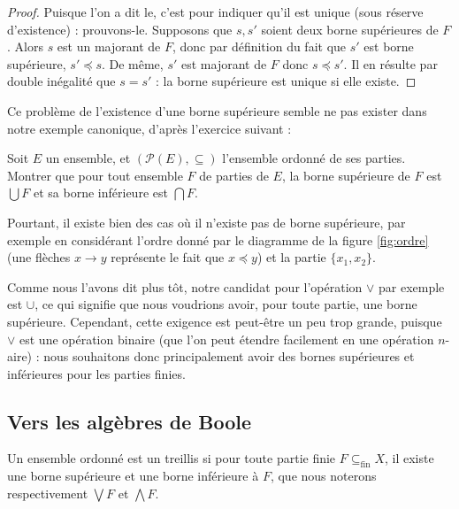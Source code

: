 \begin{proof}
    Puisque l'on a dit \og le\fg{}, c'est pour indiquer qu'il est unique (sous réserve d'existence) : prouvons-le. Supposons que $s,s'$ soient deux borne supérieures de $F$. Alors $s$ est un majorant de $F$, donc par définition du fait que $s'$ est borne supérieure, $s'\preceq s$. De même, $s'$ est majorant de $F$ donc $s\preceq s'$. Il en résulte par double inégalité que $s=s'$ : la borne supérieure est unique si elle existe.
\end{proof}

Ce problème de l'existence d'une borne supérieure semble ne pas exister dans notre exemple canonique, d'après l'exercice suivant :

\begin{exo}
    Soit $E$ un ensemble, et $(\mathcal P(E),\subseteq)$ l'ensemble ordonné de ses parties. Montrer que pour tout ensemble $F$ de parties de $E$, la borne supérieure de $F$ est $\bigcup F$ et sa borne inférieure est $\bigcap F$.
\end{exo}

Pourtant, il existe bien des cas où il n'existe pas de borne supérieure, par exemple en considérant l'ordre donné par le diagramme de la figure \ref{fig:ordre} (une flèches $x\to y$ représente le fait que $x\preceq y$) et la partie $\{x_1,x_2\}$.

\label{fig:ordre}

Comme nous l'avons dit plus tôt, notre candidat pour l'opération $\lor$ par exemple est $\cup$, ce qui signifie que nous voudrions avoir, pour toute partie, une borne supérieure. Cependant, cette exigence est peut-être un peu trop grande, puisque $\lor$ est une opération binaire (que l'on peut étendre facilement en une opération $n$-aire) : nous souhaitons donc principalement avoir des bornes supérieures et inférieures pour les parties finies.

\subsection{Vers les algèbres de Boole}

\begin{defi}[Treillis]
    Un ensemble ordonné est un treillis si pour toute partie finie $F\subseteq_\mathrm{fin} X$, il existe une borne supérieure et une borne inférieure à $F$, que nous noterons respectivement $\bigvee F$ et $\bigwedge F$.
\end{defi}

